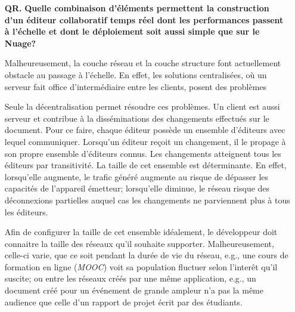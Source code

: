 \begin{itemize}
\item [\textbf{QR.}] \textbf{Quelle combinaison d'éléments permettent la
    construction d'un éditeur collaboratif temps réel dont les performances
    passent à l'échelle et dont le déploiement soit aussi simple que sur le
    Nuage?}
  
  Malheureusement, la couche réseau et la couche structure font actuellement
  obstacle au passage à l'échelle. En effet, les solutions centralisées, où un
  serveur fait office d'intermédiaire entre les clients, posent des problèmes
  Seule la décentralisation permet résoudre ces problèmes. Un client est aussi
  serveur et contribue à la disséminations des changements effectués sur le
  document. Pour ce faire, chaque éditeur possède un ensemble d'éditeurs avec
  lequel communiquer. Lorsqu'un éditeur reçoit un changement, il le propage à
  son propre ensemble d'éditeurs connus. Les changements atteignent tous les
  éditeurs par transitivité. La taille de cet ensemble est déterminante. En
  effet, lorsqu'elle augmente, le trafic généré augmente au risque de dépasser
  les capacités de l'appareil émetteur; lorsqu'elle diminue, le réseau risque
  des déconnexions partielles auquel cas les changements ne parviennent plus à
  tous les éditeurs.

  Afin de configurer la taille de cet ensemble idéalement, le développeur doit
  connaitre la taille des réseaux qu'il souhaite supporter. Malheureusement,
  celle-ci varie, que ce soit pendant la durée de vie du réseau, e.g., une cours
  de formation en ligne (\emph{MOOC}) voit sa population fluctuer selon
  l'interêt qu'il suscite; ou entre les réseaux créés par une même application,
  e.g., un document créé pour un événement de grande ampleur n'a pas la même
  audience que celle d'un rapport de projet écrit par des étudiants.



\end{itemize}
